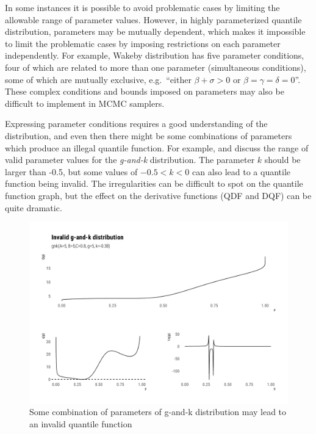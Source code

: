\documentclass[
  12pt,
]{article}
\begin{document}
In some instances it is possible to avoid problematic cases by limiting the allowable range of parameter values. However, in highly parameterized quantile distribution, parameters may be mutually dependent, which makes it impossible to limit the problematic cases by imposing restrictions on each parameter independently. For example, Wakeby distribution has five parameter conditions, four of which are related to more than one parameter (simultaneous conditions), some of which are mutually exclusive, e.g.~``either \(\beta+\sigma>0\) or \(\beta=\gamma=\delta=0\)''. These complex conditions and bounds imposed on parameters may also be difficult to implement in MCMC samplers.

Expressing parameter conditions requires a good understanding of the distribution, and even then there might be some combinations of parameters which produce an illegal quantile function. For example, \citet{prangle2017GkPackageGandk} and \citet{rayner2002NumericalMaximumLikelihood} discuss the range of valid parameter values for the \emph{g-and-k} distribution. The parameter \(k\) should be larger than -0.5, but some values of \(-0.5<k<0\) can also lead to a quantile function being invalid. The irregularities can be difficult to spot on the quantile function graph, but the effect on the derivative functions (QDF and DQF) can be quite dramatic.

\begin{figure}

{\centering \includegraphics[width=0.8\linewidth]{ilbm_article_files/figure-latex/invalid-gnk-graph-1} 

}

\caption{Some combination of parameters of g-and-k distribution may lead to an invalid quantile function}\label{fig:invalid-gnk-graph}
\end{figure}
\end{document}
